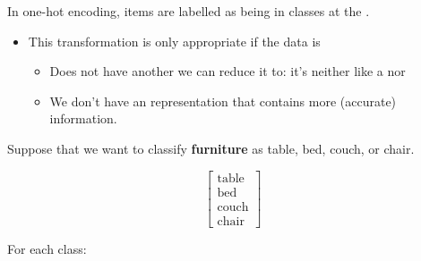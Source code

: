 \begin{definition}
                In one-hot encoding, items are  labelled as being in  classes at the .

                \begin{itemize}
                    \item This transformation is only appropriate if the data is
                        \begin{itemize}
                            \item Does not have another  we can reduce it to: it's neither like a  nor 
                            
                            \item We don't have an  representation that contains more (accurate) information.
                        \end{itemize}
                \end{itemize}
            \end{definition}
            
            \miniex Suppose that we want to classify \textbf{furniture} as table, bed, couch, or chair.
            
            \begin{equation}
                \begin{bmatrix}
                  \text{table} \\ \text{bed} \\ \text{couch} \\ \text{chair} 
                \end{bmatrix}
            \end{equation}
            
            For each class:
            
